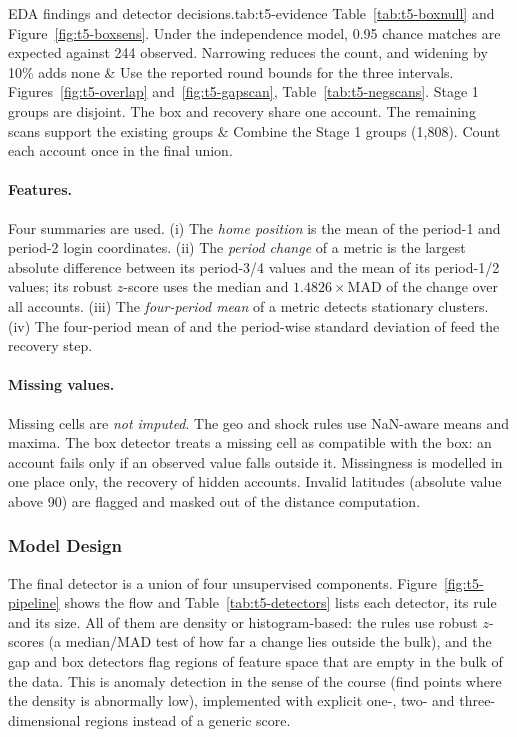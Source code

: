 \documentclass[../main.tex]{subfiles}
\begin{document}
\begin{evidencetable}{EDA findings and detector decisions.}{tab:t5-evidence}
Table~\ref{tab:t5-boxnull} and Figure~\ref{fig:t5-boxsens}. Under the independence model, 0.95 chance matches are expected against 244 observed. Narrowing reduces the count, and widening by 10\% adds none & Use the reported round bounds for the three intervals. \\
Figures~\ref{fig:t5-overlap} and~\ref{fig:t5-gapscan}, Table~\ref{tab:t5-negscans}. Stage 1 groups are disjoint. The box and recovery share one account. The remaining scans support the existing groups & Combine the Stage 1 groups (1,808). Count each account once in the final union. \\
\end{evidencetable}

\paragraph{Features.} Four summaries are used. (i) The \emph{home position} is the mean of the period-1 and period-2 login coordinates. (ii) The \emph{period change} of a metric is the largest absolute difference between its period-3/4 values and the mean of its period-1/2 values; its robust $z$-score uses the median and $1.4826\times$MAD of the change over all accounts. (iii) The \emph{four-period mean} of a metric detects stationary clusters. (iv) The four-period mean of  and the period-wise standard deviation of  feed the recovery step.

\paragraph{Missing values.} Missing cells are \emph{not imputed}. The geo and shock rules use NaN-aware means and maxima. The box detector treats a missing cell as compatible with the box: an account fails only if an observed value falls outside it. Missingness is modelled in one place only, the recovery of hidden  accounts. Invalid latitudes (absolute value above 90) are flagged and masked out of the distance computation.

\subsubsection{Model Design}
\label{sec:t5-model}

The final detector is a union of four unsupervised components. Figure~\ref{fig:t5-pipeline} shows the flow and Table~\ref{tab:t5-detectors} lists each detector, its rule and its size. All of them are density or histogram-based: the rules use robust $z$-scores (a median/MAD test of how far a change lies outside the bulk), and the gap and box detectors flag regions of feature space that are empty in the bulk of the data. This is anomaly detection in the sense of the course (find points where the density is abnormally low), implemented with explicit one-, two- and three-dimensional regions instead of a generic score.
\end{document}
